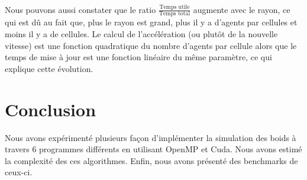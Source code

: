 \documentclass[liens,entete-ensimag,margeCorrection]{ensirapport}
\begin{document}
\paragraph{}
Nous pouvons aussi constater que le ratio $\frac{\text{Temps utile}}{\text{Temps total}}$ augmente avec le rayon, ce qui est dû au fait que, plus le rayon est grand, plus il y a d'agents par cellules et moins il y a de cellules. Le calcul de l'accélération (ou plutôt de la nouvelle vitesse)  est une fonction quadratique du nombre d'agents par cellule alors que le temps de mise à jour est une fonction linéaire du même paramètre, ce qui explique cette évolution.


\section{Conclusion}

Nous avons expérimenté plusieurs façon d'implémenter la simulation des boids à travers 6 programmes différents en utilisant OpenMP et Cuda.
Nous avons estimé la complexité des ces algorithmes.
Enfin, nous avons présenté des benchmarks de ceux-ci.
\end{document}
